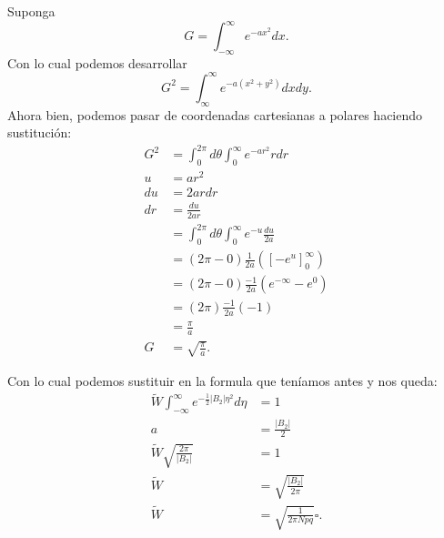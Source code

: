 \documentclass{report}
\begin{document}
Suponga \[
  G = \int_{-\infty}^{\infty} e^{-ax^2}dx
.\] 
Con lo cual podemos desarrollar \[
  G^2 = \int_{\infty}^{\infty} e^{-a\left( x^2 + y^2 \right) } dxdy
.\] Ahora bien, podemos pasar de coordenadas cartesianas a polares haciendo sustitución:
\begin{align*}
  G^2 &= \int_{0}^{2\pi}d\theta \int_{0}^{\infty} e^{-a r^2}r dr\\
  u&= ar^2 \\
  du &= 2ar dr \\
  dr &= \frac{du}{2ar} \\
  &=  \int_{0}^{2\pi}d\theta \int_{0}^{\infty} e^{-u} \frac{du}{2a}\\
  &= \left( 2\pi - 0 \right)\frac{1}{2a} \left( \left[ -e^{u} \right]_0^{\infty} \right) \\
  &= \left( 2\pi - 0 \right)\frac{-1}{2a} \left( e^{-\infty} - e^{0} \right) \\
  &= \left( 2\pi \right)\frac{-1}{2a} \left( -1 \right) \\
  &= \frac{\pi}{a}\\
  G &= \sqrt{\frac{\pi}{a}}
.\end{align*}

Con lo cual podemos sustituir en la formula que teníamos antes y nos queda:
\begin{align*}
  \tilde{W}\int_{-\infty}^{\infty} e^{-\frac{1}{2}\left| B_2 \right| \eta^2}d\eta &= 1 \\
  a &= \frac{\left| B_2 \right| }{2} \\
\tilde{W}  \sqrt{\frac{2\pi}{\left| B_2 \right| }} &= 1 \\
\tilde{W} &= \sqrt{\frac{\left| B_2 \right| }{2\pi}}  \\
\tilde{W} &= \sqrt{\frac{1}{2\pi Npq}} \square
.\end{align*}

\chapter{}

\section{}
\end{document}
